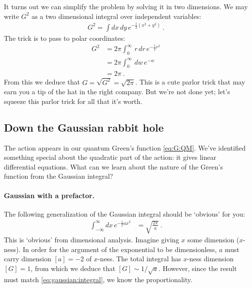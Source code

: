 It turns out we can simplify the problem by solving it in two dimensions. We may write $G^2$ as a two dimensional integral over independent variables:
\begin{align}
	G^2 = \int dx\, dy\, e^{-\frac{1}{2}(x^2 + y^2)} \ .
\end{align}
The trick is to pass to polar coordinates:
\begin{align}
	G^2 &= 2\pi \int_0^\infty\, r\,dr\, e^{-\frac{1}{2}r^2}
	\\
	&= 2\pi \int_0^\infty\, dw\, e^{-w}
	\\
	&= 2\pi \ . \label{eq:gaussian:integral}
\end{align}
From this we deduce that $G = \sqrt{G^2} = \sqrt{2\pi}$. This is a cute parlor trick that may earn you a tip of the hat in the right company. But we're not done yet; let's squeeze this parlor trick for all that it's worth.

\subsection{Down the Gaussian rabbit hole}

The action appears in our quantum Green's function \eqref{eq:G:QM}. We've identified something special about the quadratic part of the action: it gives linear differential equations. What can we learn about the nature of the Green's function from the Gaussian integral?

\paragraph{Gaussian with a prefactor.} The following generalization of the Gaussian integral should be `obvious' for you:
\begin{align}
	\int_{-\infty}^{\infty}dx\, e^{-\frac{1}{2}ax^2}
	&=
	\sqrt{\frac{2\pi}{a}} \ .
	\label{eq:gaussian:a}
\end{align}
This is `obvious' from dimensional analysis. Imagine giving $x$ some dimension ($x$-ness). In order for the argument of the exponential to be dimensionless, $a$ must carry dimension $[a]=-2$ of $x$-ness. The total integral has $x$-ness dimension $[G]=1$, from which we deduce that $[G]\sim 1/\sqrt{a}$. However, since the result must match \eqref{eq:gaussian:integral}, we know the proportionality.

